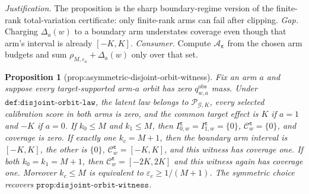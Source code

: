 \documentclass{article}
\newtheorem{proposition}{Proposition}
\begin{document}
\par\smallskip\noindent \textit{Justification.} The proposition is the sharp boundary-regime version of the finite-rank total-variation certificate: only finite-rank arms can fail after clipping. \textit{Gap.} Charging \(\Delta_a(w)\) to a boundary arm understates coverage even though that arm's interval is already \([-K,K]\). \textit{Consumer.} Compute \(\mathcal A_{\boldsymbol\varepsilon}\) from the chosen arm budgets and sum \(\rho_{M,\varepsilon_a}+\Delta_a(w)\) only over that set.

\begin{proposition}[prop:asymmetric-disjoint-orbit-witness]\label{prop:asymmetric-disjoint-orbit-witness}
Fix an arm \(a\) and suppose every target-supported arm-\(a\) orbit has zero \(q^{\mathrm{obs}}_{w,a}\) mass. Under \(\texttt{def:disjoint-orbit-law}\), the latent law belongs to \(\mathcal P_{\mathcal G,K}\), every selected calibration score in both arms is zero, and the common target effect is \(K\) if \(a=1\) and \(-K\) if \(a=0\). If \(k_0\le M\) and \(k_1\le M\), then \(I^{\boldsymbol\varepsilon}_{0,w}=I^{\boldsymbol\varepsilon}_{1,w}=\{0\}\), \(\mathcal C^{\boldsymbol\varepsilon}_w=\{0\}\), and coverage is zero. If exactly one \(k_c=M+1\), then the boundary arm interval is \([-K,K]\), the other is \(\{0\}\), \(\mathcal C^{\boldsymbol\varepsilon}_w=[-K,K]\), and this witness has coverage one. If both \(k_0=k_1=M+1\), then \(\mathcal C^{\boldsymbol\varepsilon}_w=[-2K,2K]\) and this witness again has coverage one. Moreover \(k_c\le M\) is equivalent to \(\varepsilon_c\ge1/(M+1)\). The symmetric choice recovers \(\texttt{prop:disjoint-orbit-witness}\).
\end{proposition}
\end{document}
